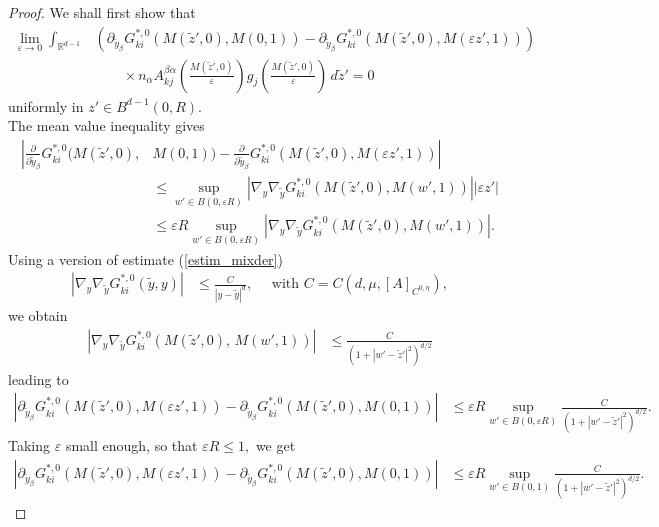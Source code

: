 \documentclass[11pt, reqno]{amsart}
\theoremstyle{definition}
\theoremstyle{remark}
\numberwithin{equation}{section}
\begin{document}
\begin{proof}[Proof]
		\noindent We shall first show that 
		\begin{align*}
			\lim_{\varepsilon\rightarrow 0} 	\int_{\mathbb{R}^{d-1}}\!\! &\left(\partial_{\tilde{y}_\beta} G^{*,0}_{ki} \left(M(\tilde{z}',0),M (0,1) \right) 
			-\partial_{\tilde{y}_\beta} G^{*,0}_{ki}\left(M(\tilde{z}',0),M (\varepsilon z',1) \right) \right)\\
			&\qquad \times n_\alpha A^{\beta\alpha}_{kj} \left(\frac{M(\tilde{z}',0)}{\varepsilon }\right) g_j\left(\frac{M(\tilde{z}',0)}{\varepsilon }\right)  \,d\tilde{z}' =0
		\end{align*} uniformly in $z'\in B^{d-1}(0,R).$\\
		
		
		\noindent The mean value inequality gives 
		\begin{align*}
			\left|  \frac{\partial}{\partial \tilde{y}_\beta} G^{*,0}_{ki} (M(\tilde{z}',0),\right.&M (0,1) )- \left.\frac{\partial}{\partial \tilde{y}_\beta} G^{*,0}_{ki}(M(\tilde{z}',0),M (\varepsilon z',1) )\right|\\
			&\leq \sup_{w'\in B(0,\varepsilon R)} | \nabla_y \nabla_{\tilde{y}} G^{*,0}_{ki}\left(M(\tilde{z}',0),M (w',1) \right)| | \varepsilon z'|\\
			&\leq \varepsilon R \sup_{w'\in B(0,\varepsilon R)} |\nabla_y \nabla_{\tilde{y}} G^{*,0}_{ki}(M(\tilde{z}',0),M (w',1) )|.
		\end{align*}
		Using a version of  estimate  (\ref{estim_mixder}) 
		\begin{align*}
			|  \nabla_y \nabla_{\tilde{y}} G^{*,0}_{ki}(\tilde{y},y ) | &\leq\frac{C}{|y-\tilde{y}|^{d}}, \quad \mbox{ with } C=C(d,\mu,[A]_{C^{0,\eta}} ),
		\end{align*}
		we obtain 
		\begin{align*}
			\left|\nabla_y \nabla_{\tilde{y}} G^{*,0}_{ki}\left(M(\tilde{z}',0),\, M (w',1) \right)\right|
			&\leq \frac{C}{(1+|w'-\tilde{z}'|^2)^{d/2}}
		\end{align*}
		leading to
		\begin{align*}
			\left| \partial_{\tilde{y}_\beta} G^{*,0}_{ki}\left(M(\tilde{z}',0),M (\varepsilon z',1) \right) -  \partial_{\tilde{y}_\beta} G^{*,0}_{ki}(M(\tilde{z}',0),M (0,1) ) \right|
			&\leq \varepsilon R \!\!\sup_{w'\in B(0,\varepsilon R)}\frac{C}{(1+|w'-\tilde{z}'|^2)^{d/2}}.
		\end{align*}
		Taking $\varepsilon$ small enough, so that $\varepsilon R\leq 1,$ we get  
		\begin{align*}
			\left| \partial_{\tilde{y}_\beta} G^{*,0}_{ki}\left(M(\tilde{z}',0),M (\varepsilon z',1) \right) -  \partial_{\tilde{y}_\beta} G^{*,0}_{ki}(M(\tilde{z}',0),M (0,1) ) \right|&\leq \varepsilon R \!\!\! \sup_{w'\in B(0,1)}\frac{C}{(1+|w'-\tilde{z}'|^2)^{d/2}}.

\end{align*}
\end{proof}
\end{document}
